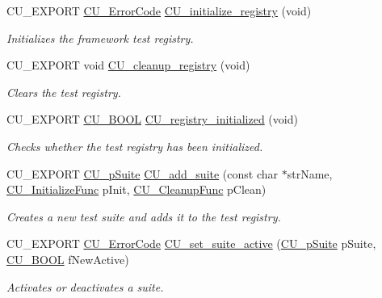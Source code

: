 \begin{DoxyCompactItemize}
C\-U\-\_\-\-E\-X\-P\-O\-R\-T \hyperlink{group__Framework_ga743a2a025ee3eb792d7d85f0eea347e6}{C\-U\-\_\-\-Error\-Code} \hyperlink{group__Framework_ga3477b2d3e57c8f8aba36bbbdfa54920d}{C\-U\-\_\-initialize\-\_\-registry} (void)
\begin{DoxyCompactList}\small\item\em Initializes the framework test registry. \end{DoxyCompactList}\item 
C\-U\-\_\-\-E\-X\-P\-O\-R\-T void \hyperlink{group__Framework_ga183eb7d7f79e149c767237cfef52cb82}{C\-U\-\_\-cleanup\-\_\-registry} (void)
\begin{DoxyCompactList}\small\item\em Clears the test registry. \end{DoxyCompactList}\item 
C\-U\-\_\-\-E\-X\-P\-O\-R\-T \hyperlink{group__Framework_gabd98d449e979a6379b06551242106dd4}{C\-U\-\_\-\-B\-O\-O\-L} \hyperlink{group__Framework_gab976af96105872cb082ff4835cac1696}{C\-U\-\_\-registry\-\_\-initialized} (void)
\begin{DoxyCompactList}\small\item\em Checks whether the test registry has been initialized. \end{DoxyCompactList}\item 
C\-U\-\_\-\-E\-X\-P\-O\-R\-T \hyperlink{group__Framework_gaba832ae8b235f5e70d6a4ac9c3bb1219}{C\-U\-\_\-p\-Suite} \hyperlink{group__Framework_ga94b8f1bbbd93b154a60bb1d43391b48a}{C\-U\-\_\-add\-\_\-suite} (const char $\ast$str\-Name, \hyperlink{group__Framework_gaab4b8ad3aa3a3c222c43c8a330de11e3}{C\-U\-\_\-\-Initialize\-Func} p\-Init, \hyperlink{group__Framework_ga90966c0bede742195897c3aeff4c342b}{C\-U\-\_\-\-Cleanup\-Func} p\-Clean)
\begin{DoxyCompactList}\small\item\em Creates a new test suite and adds it to the test registry. \end{DoxyCompactList}\item 
C\-U\-\_\-\-E\-X\-P\-O\-R\-T \hyperlink{group__Framework_ga743a2a025ee3eb792d7d85f0eea347e6}{C\-U\-\_\-\-Error\-Code} \hyperlink{group__Framework_ga4e93ba1b139239e674b733fbab37988e}{C\-U\-\_\-set\-\_\-suite\-\_\-active} (\hyperlink{group__Framework_gaba832ae8b235f5e70d6a4ac9c3bb1219}{C\-U\-\_\-p\-Suite} p\-Suite, \hyperlink{group__Framework_gabd98d449e979a6379b06551242106dd4}{C\-U\-\_\-\-B\-O\-O\-L} f\-New\-Active)
\begin{DoxyCompactList}\small\item\em Activates or deactivates a suite. \end{DoxyCompactList}\item 

\end{DoxyCompactItemize}
